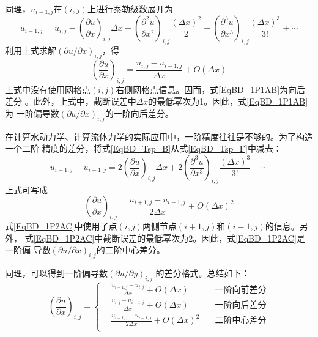 同理，$u_{i-1,j}$在$(i,j)$上进行泰勒级数展开为
\begin{equation}
  u_{i-1,j}
  =
  u_{i,j} - 
  \left(
    \frac{\partial u}{\partial x}
  \right)_{i,j}
  \Delta x
  +
  \left(
    \frac{\partial^{2} u}{\partial x^{2}}
  \right)_{i,j}
  \frac{(\Delta x)^{2}}{2}
  -
  \left(
    \frac{\partial^{3} u}{\partial x^{3}}
  \right)_{i,j}
  \frac{(\Delta x)^{3}}{3!}
  +
  \cdots
  \label{EqBD_Tsp_B}
\end{equation}
利用上式求解$(\partial u/\partial x)_{i,j}$，得
\begin{equation}
  \left(
    \frac{\partial u}{\partial x}
  \right)_{i,j}
  =
  \frac{u_{i,j}-u_{i-1,j}}{\Delta x}
  +
  O(\Delta x)
  \label{EqBD_1P1AB}
\end{equation}
上式中没有使用网格点$(i,j)$右侧网格点信息。因而，式\eqref{EqBD_1P1AB}为向后差分
。此外，上式中，截断误差中$\Delta x$的最低幂次为1。因此，式\eqref{EqBD_1P1AB}为
一阶偏导数$(\partial u/\partial x)_{i,j}$的一阶向后差分。

在计算水动力学、计算流体力学的实际应用中，一阶精度往往是不够的。为了构造一个二阶
精度的差分，将式\eqref{EqBD_Tsp_B}从式\eqref{EqBD_Tsp_F}中减去：
\begin{equation}
  u_{i+1,j} - u_{i-1,j}
  =
  2
  \left(
    \frac{\partial u}{\partial x}
  \right)_{i,j}
  \Delta x
  +
  2
  \left(
    \frac{\partial^3 u}{\partial x^3}
  \right)_{i,j}
  \frac{(\Delta x)^3}{3!}
  +
  \cdots
\end{equation}
上式可写成
\begin{equation}
  \left(
    \frac{\partial u}{\partial x}
  \right)_{i,j}
  =
  \frac{u_{i+1,j} - u_{i-1,j}}{2\Delta x}
  +
  O(\Delta x)^2
  \label{EqBD_1P2AC}
\end{equation}
式\eqref{EqBD_1P2AC}中使用了点$(i,j)$两侧节点$(i+1,j)$和$(i-1,j)$的信息。另外，
式\eqref{EqBD_1P2AC}中截断误差的最低幂次为2。因此，式\eqref{EqBD_1P2AC}是一阶偏
导数$(\partial u/\partial x)_{i,j}$的二阶中心差分。

同理，可以得到一阶偏导数$(\partial u/\partial y)_{i,j}$
的差分格式。总结如下：
\begin{equation}
  \left(
    \frac{\partial u}{\partial x}
  \right)_{i,j}
  =
  \left\{
    \begin{aligned}
      &\frac{u_{i+1,j}-u_{i,j}}{\Delta x} + O(\Delta x) & \mbox{一阶向前差分} \\
      &\frac{u_{i,j}-u_{i-1,j}}{\Delta x} + O(\Delta x) & \mbox{一阶向后差分} \\
      &\frac{u_{i+1,j}-u_{i-1,j}}{2\Delta x} + O(\Delta x)^{2} \quad& \mbox{二阶中心差分} \\
    \end{aligned}
  \right.
\end{equation}

